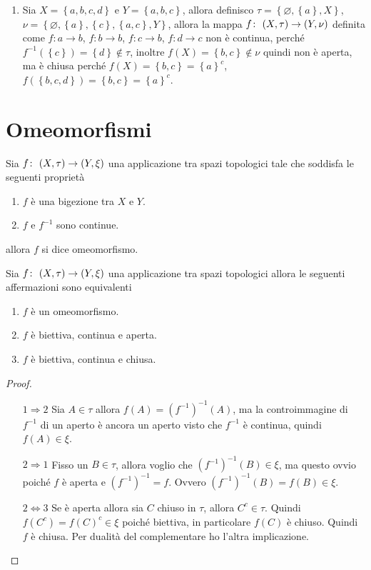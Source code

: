 \begin{example}
\begin{enumerate}
	\item Sia $X = \left\{a,b,c,d\right\}$  e $Y = \left\{a,b,c\right\}$, allora definisco $\tau = \left\{\varnothing, \left\{a\right\}, X\right\}$, $\nu = \left\{\varnothing, \left\{a\right\}, \left\{c\right\}, \left\{a,c\right\}, Y\right\}$, allora la mappa $f \colon\ (X,\tau) \rightarrow (Y,\nu)$ definita come $f \colon a \rightarrow b$,  $f \colon b \rightarrow b$, $f \colon c \rightarrow b$, $f \colon d \rightarrow c$ non è continua, perché $f^{-1}(\left\{c\right\}) = \left\{d\right\} \notin \tau$, inoltre $f(X) = \left\{b,c\right\} \notin \nu$ quindi non è aperta, ma è chiusa perché $f(X) = \left\{b,c\right\} = \left\{a\right\}^c$, $f(\left\{b,c,d\right\}) = \left\{b,c\right\} = \left\{a\right\}^c$.   
\end{enumerate}
\end{example}

\section{Omeomorfismi}

\begin{definition}
	Sia $f \colon\ (X,\tau) \rightarrow (Y,\xi)$ una applicazione tra spazi topologici tale che soddisfa le seguenti proprietà
	\begin{enumerate}
		\item $f$ è una bigezione tra $X$ e $Y$.
		\item $f$ e $f^{-1}$ sono continue.
	\end{enumerate} 
	allora $f$ si dice omeomorfismo. 
\end{definition}

\begin{theorem}
	Sia $f \colon\ (X,\tau) \rightarrow (Y,\xi)$ una applicazione tra spazi topologici allora le seguenti affermazioni sono equivalenti
	\begin{enumerate}
		\item $f$ è un omeomorfismo.
		\item $f$ è biettiva, continua e aperta.
		\item $f$ è biettiva, continua e chiusa.
	\end{enumerate}
\end{theorem}
\begin{proof}
	\begin{enumerate}
		\item[$1 \Rightarrow 2$] Sia $A \in \tau$ allora $f(A) = (f^{-1})^{-1}(A)$, ma la controimmagine di $f^{-1}$ di un aperto è ancora un aperto visto che $f^{-1}$ è continua, quindi $f(A) \in \xi$.
		\item[$2 \Rightarrow 1$] Fisso un $B \in \tau$, allora voglio che $(f^{-1})^{-1}(B) \in \xi$, ma questo ovvio poiché $f$ è aperta e $(f^{-1})^{-1} = f$. Ovvero $(f^{-1})^{-1}(B) = f(B) \in \xi$.
		\item[$2\Leftrightarrow 3$] Se è aperta allora sia $C$ chiuso in $\tau$, allora $C^{c} \in \tau$. Quindi $f(C^c) = f(C)^c \in \xi$ poiché biettiva, in particolare $f(C)$ è chiuso. Quindi $f$ è chiusa. Per dualità del complementare ho l'altra implicazione.
	\end{enumerate}
\end{proof}

